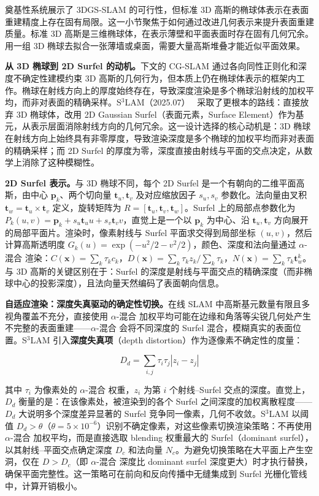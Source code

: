 奠基性系统展示了 3DGS-SLAM 的可行性，但标准 3D 高斯的椭球体表示在表面重建精度上存在固有局限。这一小节聚焦于如何通过改进几何表示来提升表面重建质量。标准 3D 高斯是三维椭球体，在表示薄壁和平面表面时存在固有几何冗余。用一组 3D 椭球去拟合一张薄墙或桌面，需要大量高斯堆叠才能近似平面效果。

\textbf{从 3D 椭球到 2D Surfel 的动机。}下文的 CG-SLAM 通过各向同性正则化和深度不确定性建模约束 3D 高斯的几何行为，但本质上仍在椭球体表示的框架内工作。椭球在射线方向上的厚度始终存在，导致深度渲染是多个椭球沿射线的加权平均，而非对表面的精确采样。S$^3$LAM（2025.07）~\cite{2507_20854} 采取了更根本的路线：直接放弃 3D 椭球体，改用 2D Gaussian Surfel（表面元素，Surface Element）作为基元，从表示层面消除射线方向的几何冗余。这一设计选择的核心动机是：3D 椭球在射线方向上始终具有非零厚度，导致渲染深度是多个椭球的加权平均而非对表面的精确采样；而 2D Surfel 的厚度为零，深度直接由射线与平面的交点决定，从数学上消除了这种模糊性。

\textbf{2D Surfel 表示。}与 3D 椭球不同，每个 2D Surfel 是一个有朝向的二维平面高斯，由中心 $\mathbf{p}_k$、两个切向量 $\mathbf{t}_u, \mathbf{t}_v$ 及对应缩放因子 $s_u, s_v$ 参数化。法向量由叉积 $\mathbf{t}_w = \mathbf{t}_u \times \mathbf{t}_v$ 定义，旋转矩阵为 $R = [\mathbf{t}_u, \mathbf{t}_v, \mathbf{t}_w]$。Surfel 上的局部点参数化为 $P_k(u,v) = \mathbf{p}_k + s_u \mathbf{t}_u u + s_v \mathbf{t}_v v$，直觉上是一个以 $\mathbf{p}_k$ 为中心、沿 $\mathbf{t}_u, \mathbf{t}_v$ 方向展开的局部平面片。渲染时，像素射线与 Surfel 平面求交得到局部坐标 $(u,v)$，然后计算高斯透明度 $G_k(u) = \exp(-u^2/2 - v^2/2)$，颜色、深度和法向量通过 $\alpha$-混合 渲染：$C(\mathbf{x}) = \sum_k \tau_k c_k$，$D(\mathbf{x}) = \sum_k \tau_k z_k / \sum_k \tau_k$，$N(\mathbf{x}) = \sum_k \tau_k \mathbf{t}_w^k$。与 3D 高斯的关键区别在于：Surfel 的深度是射线与平面交点的精确深度（而非椭球中心的投影深度），且法向量天然编码了表面朝向信息。

\textbf{自适应渲染：深度失真驱动的确定性切换。}在线 SLAM 中高斯基元数量有限且多视角覆盖不充分，直接使用 $\alpha$-混合 加权平均可能在边缘和角落等尖锐几何处产生不完整的表面重建——$\alpha$-混合 会将不同深度的 Surfel 混合，模糊真实的表面位置。S$^3$LAM 引入\textbf{深度失真项}（depth distortion）作为逐像素不确定性的度量：

\begin{equation}
    D_d = \sum_{i,j} \tau_i \tau_j |z_i - z_j|
\end{equation}

其中 $\tau_i$ 为像素处的 $\alpha$-混合 权重，$z_i$ 为第 $i$ 个射线--Surfel 交点的深度。直觉上，$D_d$ 衡量的是：在该像素处，被渲染到的各个 Surfel 之间深度的加权离散程度——$D_d$ 大说明多个深度差异显著的 Surfel 竞争同一像素，几何不收敛。S$^3$LAM 以阈值 $D_d > \theta$（$\theta = 5 \times 10^{-6}$）识别不确定像素，对这些像素切换渲染策略：不再使用 $\alpha$-混合 加权平均，而是直接选取 blending 权重最大的 Surfel（dominant surfel），以其射线--平面交点确定深度 $D_c$ 和法向量 $N_c$。为避免切换策略在大平面上产生空洞，仅在 $D > D_c$（即 $\alpha$-混合 深度比 dominant surfel 深度更大）时才执行替换，确保平面完整性。这一策略可在前向和反向传播中无缝集成到 Surfel 光栅化管线中，计算开销极小。


